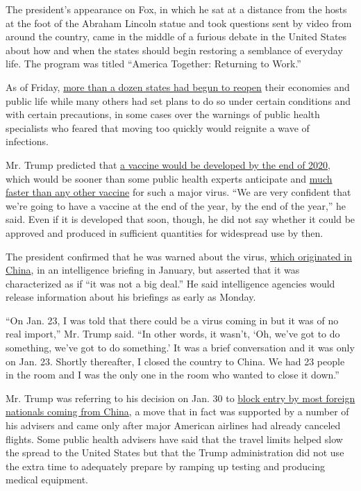 The president's appearance on Fox, in which he sat at a distance from
the hosts at the foot of the Abraham Lincoln statue and took questions
sent by video from around the country, came in the middle of a furious
debate in the United States about how and when the states should begin
restoring a semblance of everyday life. The program was titled ``America
Together: Returning to Work.''

As of Friday,
\href{https://www.nytimes.com/interactive/2020/us/states-reopen-map-coronavirus.html}{more
than a dozen states had begun to reopen} their economies and public life
while many others had set plans to do so under certain conditions and
with certain precautions, in some cases over the warnings of public
health specialists who feared that moving too quickly would reignite a
wave of infections.

Mr. Trump predicted that
\href{https://www.nytimes.com/2020/05/02/us/politics/vaccines-coronavirus-research.html}{a
vaccine would be developed by the end of 2020}, which would be sooner
than some public health experts anticipate and
\href{https://www.nytimes.com/2020/04/18/health/coronavirus-america-future.html}{much
faster than any other vaccine} for such a major virus. ``We are very
confident that we're going to have a vaccine at the end of the year, by
the end of the year,'' he said. Even if it is developed that soon,
though, he did not say whether it could be approved and produced in
sufficient quantities for widespread use by then.

The president confirmed that he was warned about the virus,
\href{https://www.nytimes.com/2020/05/03/world/europe/backlash-china-coronavirus.html}{which
originated in China}, in an intelligence briefing in January, but
asserted that it was characterized as if ``it was not a big deal.'' He
said intelligence agencies would release information about his briefings
as early as Monday.

``On Jan. 23, I was told that there could be a virus coming in but it
was of no real import,'' Mr. Trump said. ``In other words, it wasn't,
`Oh, we've got to do something, we've got to do something.' It was a
brief conversation and it was only on Jan. 23. Shortly thereafter, I
closed the country to China. We had 23 people in the room and I was the
only one in the room who wanted to close it down.''

Mr. Trump was referring to his decision on Jan. 30 to
\href{https://www.nytimes.com/2020/01/31/business/china-travel-coronavirus.html}{block
entry by most foreign nationals coming from China}, a move that in fact
was supported by a number of his advisers and came only after major
American airlines had already canceled flights. Some public health
advisers have said that the travel limits helped slow the spread to the
United States but that the Trump administration did not use the extra
time to adequately prepare by ramping up testing and producing medical
equipment.

